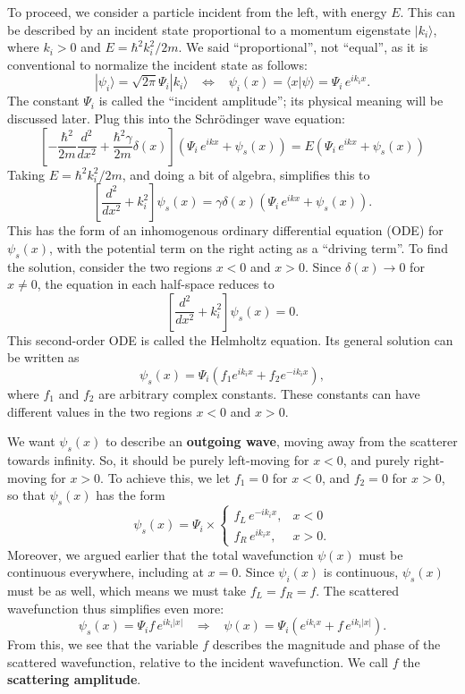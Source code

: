 \documentclass[pra,11pt]{revtex4}
\begin{document}
To proceed, we consider a particle incident from the left, with
energy $E$.  This can be described by an incident state proportional
to a momentum eigenstate $|k_i\rangle$, where $k_i > 0$ and $E =
\hbar^2k_i^2/2m$.  We said ``proportional'', not ``equal'', as it
is conventional to normalize the incident state as follows:
$$|\psi_i\rangle = \sqrt{2\pi}\Psi_i |k_i\rangle \;\;\; \Leftrightarrow\;\;\; \psi_i(x) = \langle x|\psi\rangle = \Psi_i \, e^{ik_i x}.$$
The constant $\Psi_i$ is called the ``incident amplitude''; its
physical meaning will be discussed later.  Plug this into the
Schr\"odinger wave equation:
$$\left[-\frac{\hbar^2}{2m} \frac{d^2}{dx^2} + \frac{\hbar^2\gamma}{2m}\delta(x)\right] \left(\Psi_i \, e^{ikx} + \psi_s(x) \right) = E \left(\Psi_i \, e^{ikx} + \psi_s(x) \right)$$
Taking $E = \hbar^2k_i^2/2m$, and doing a bit of algebra, simplifies this to
$$\left[ \frac{d^2}{dx^2} + k_i^2\right] \psi_s(x) =  \gamma \delta(x) \left(\Psi_i \, e^{ikx} + \psi_s(x) \right).$$
This has the form of an inhomogenous ordinary differential equation (ODE)
for $\psi_s(x)$, with the potential term on the right acting
as a ``driving term''.  To find the solution, consider the two regions $x <
0$ and $x > 0$.  Since $\delta(x) \rightarrow 0$ for $x \ne 0$, the
equation in each half-space reduces to
$$\left[\frac{d^2}{dx^2} + k_i^2\right] \psi_s(x) = 0.$$
This second-order ODE is called the Helmholtz equation.  Its general
solution can be written as
$$\psi_s(x) = \Psi_i \left(f_1 e^{ik_i x} + f_2 e^{-ik_i x}\right),$$
where $f_1$ and $f_2$ are arbitrary complex constants.  These
constants can have different values in the two regions $x < 0$ and $x
> 0$.

We want $\psi_s(x)$ to describe an \textbf{outgoing wave}, moving away
from the scatterer towards infinity.  So, it should be purely
left-moving for $x < 0$, and purely right-moving for $x > 0$.  To
achieve this, we let $f_1 = 0$ for $x < 0$, and $f_2 = 0$ for $x > 0$,
so that $\psi_s(x)$ has the form
$$\psi_s(x) = \Psi_i \times \begin{cases}f_L \,e^{-ik_ix}, & x < 0 \\ f_R \,e^{ik_ix}, & x > 0.\end{cases}$$
Moreover, we argued earlier that the total wavefunction $\psi(x)$ must
be continuous everywhere, including at $x = 0$.  Since $\psi_i(x)$ is
continuous, $\psi_s(x)$ must be as well, which means we must take $f_L
= f_R = f$.  The scattered wavefunction thus simplifies even more:
$$\psi_s(x) = \Psi_i f \,e^{ik_i|x|} \;\;\; \Rightarrow \;\;\; \psi(x) = \Psi_i \left(e^{ik_i x} + f \,e^{ik_i|x|}\right).$$
From this, we see that the variable $f$ describes the magnitude and
phase of the scattered wavefunction, relative to the incident
wavefunction.  We call $f$ the \textbf{scattering amplitude}.
\end{document}
